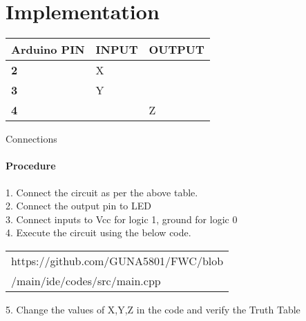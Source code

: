\documentclass[journal,12pt,two column]{IEEEtran}
\begin{document}
    
\section{Implementation}
  \begin{tabularx}{0.46\textwidth} { 
  | >{\centering\arraybackslash}X 
  | >{\centering\arraybackslash}X 
  | >{\centering\arraybackslash}X  | }


\hline
\textbf{Arduino PIN} & \textbf{INPUT} & \textbf{OUTPUT} \\ 
\hline
\textbf 2 & X & \\
\hline
\textbf 3 & Y & \\
\hline
\textbf 4 && Z \\
\hline
\end{tabularx}

\begin{center}
    Connections
\end{center}

    \paragraph{Procedure}
    
    1. Connect the circuit as per the above table.\\
    2. Connect the output pin to LED\\
    3. Connect inputs to Vcc for logic 1, ground for logic 0\\
    4. Execute the circuit using the below code.\\
   
\begin{tabularx}{0.46\textwidth} { 
  | >{\centering\arraybackslash}X |}
  \hline
  https://github.com/GUNA5801/FWC/blob\\/main/ide/codes/src/main.cpp\\
  \hline
\end{tabularx}

   
5. Change the values of X,Y,Z in the code and verify the Truth Table\\



\end{document}

